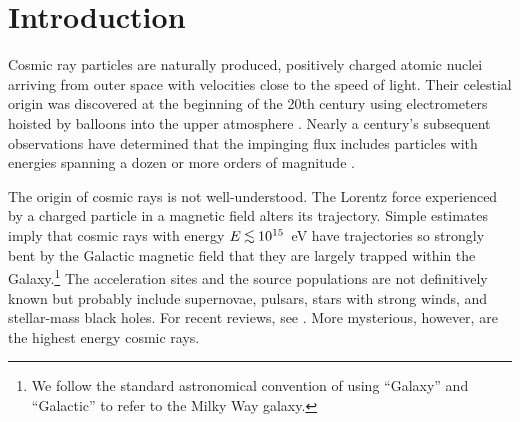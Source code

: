 \section{Introduction}

Cosmic ray particles are naturally produced, positively charged atomic nuclei
arriving from outer space with velocities close to the speed of light.  Their
celestial origin was discovered at the beginning of the 20th century using
electrometers hoisted by balloons into the upper atmosphere \cite{Hess12}. 
Nearly a century's subsequent observations have determined that the impinging
flux includes particles with energies spanning a dozen or more orders of
magnitude \cite{Cronin99}.

The origin of cosmic rays is not well-understood. The Lorentz force
experienced by a charged particle in a magnetic field alters its trajectory.
Simple estimates imply that cosmic rays with energy $E \lta 10^{15}$~eV 
have trajectories so strongly bent
by the Galactic magnetic field that they are largely trapped within the
Galaxy.\footnote{We follow the standard astronomical convention of using
``Galaxy'' and ``Galactic'' to refer to the Milky Way galaxy.}  The
acceleration sites and the source populations are not definitively known but
probably include supernovae, pulsars, stars with strong winds, and
stellar-mass black holes. For recent reviews, see \cite{Cronin99,Hillas06}.
More mysterious, however, are the highest energy
cosmic rays.

